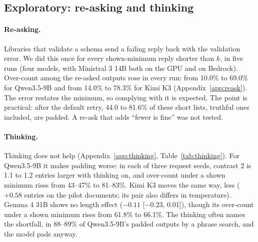 \subsection{Exploratory: re-asking and thinking}
\label{sec:exploratory}

\paragraph{Re-asking.}
Libraries that validate a schema send a failing reply back with the validation error.
We did this once for every shown-minimum reply shorter than $k$, in five runs (four models, with Ministral 3 14B both on the GPU and on Bedrock).
Over-count among the re-asked outputs rose in every run: from 10.0\% to 69.0\% for Qwen3.5-9B and from 14.0\% to 78.3\% for Kimi K3 (Appendix~\ref{app:reask}).
The error restates the minimum, so complying with it is expected.
The point is practical: after the default retry, 44.0 to 81.6\% of these short lists, truthful ones included, are padded.
A re-ask that adds ``fewer is fine'' was not tested.

\paragraph{Thinking.}
Thinking does not help (Appendix~\ref{app:thinking}, Table~\ref{tab:thinking}).
For Qwen3.5-9B it makes padding worse: in each of three request seeds, contrast 2 is 1.1 to 1.2 entries larger with thinking on, and over-count under a shown minimum rises from 43--47\% to 81--83\%.
Kimi K3 moves the same way, less ($+0.58$ entries on the pilot documents; its pair also differs in temperature).
Gemma 4 31B shows no length effect ($-0.11$ [$-0.23$, 0.01]), though its over-count under a shown minimum rises from 61.8\% to 66.1\%.
The thinking often names the shortfall, in 88--89\% of Qwen3.5-9B's padded outputs by a phrase search, and the model pads anyway.
